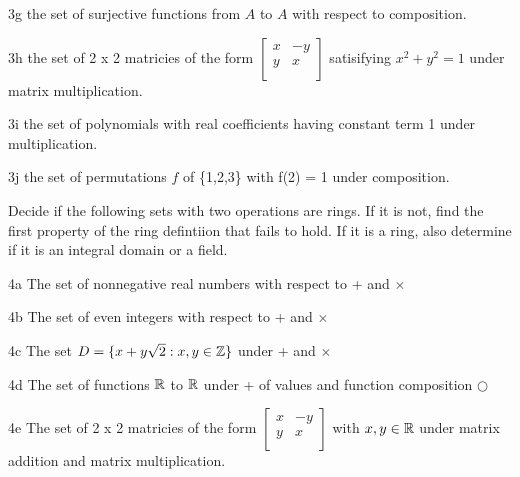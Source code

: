 \begin{question}{3g}
the set of surjective functions from $A$ to $A$ with respect to composition.
\end{question}


\begin{question}{3h}
the set of 2 x 2 matricies of the form $\begin{bmatrix}
  x & -y \\
  y & x  \\
 \end{bmatrix}$ satisifying $x^2 + y^2 = 1$ under matrix multiplication.

\end{question}


\begin{question}{3i}
the set of polynomials with real coefficients having constant term 1 under multiplication.
\end{question}


\begin{question}{3j}
the set of permutations $f$ of \{1,2,3\} with f(2) = 1 under composition.
\end{question}


\begin{question}{4}
Decide if the following sets with two operations are rings. If it is not, find the first property of the ring defintiion that fails to hold. If it is a ring, also determine if it is an integral domain or a field.
\end{question}

\begin{question}{4a}
The set of nonnegative real numbers with respect to + and $\times$
\end{question}

\begin{question}{4b}
The set of even integers with respect to + and $\times$
\end{question}

\begin{question}{4c}
The set $D = \{x+y\sqrt{2} : x, y \in \mathbb{Z}\}$ under + and $\times$
\end{question}

\begin{question}{4d}
The set of functions $\mathbb{R}$ to $\mathbb{R}$ under + of values and function composition $\bigcirc$
\end{question}

\begin{question}{4e}
The set of 2 x 2 matricies of the form $\begin{bmatrix}
  x & -y \\
  y & x  \\
 \end{bmatrix}$ with $x,y \in \mathbb{R}$ under matrix addition and matrix multiplication. 
\end{question}

